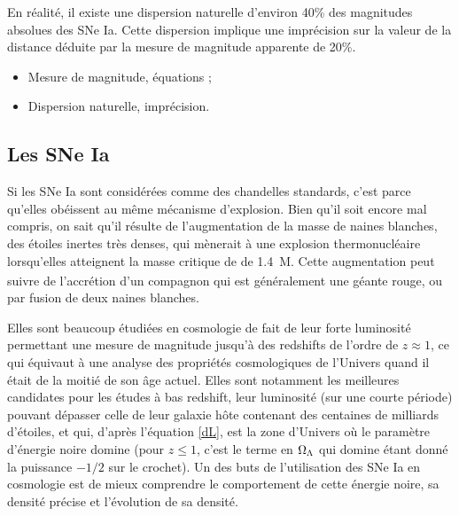 \documentclass[a4paper, 12pt, svgnames]{article}
\begin{document}
En réalité, il existe une dispersion naturelle d'environ 40\% des magnitudes
absolues des SNe Ia. Cette dispersion implique une imprécision sur la valeur de
la distance déduite par la mesure de magnitude apparente de 20\%.

%

\begin{itemize}
    \item Mesure de magnitude, équations ;
    \item Dispersion naturelle, imprécision.
\end{itemize}

\subsection{Les SNe Ia}\label{ssc:sneia}

Si les SNe Ia sont considérées comme des chandelles standards, c'est parce
qu'elles obéissent au même mécanisme d'explosion. Bien qu'il soit encore mal
compris, on sait qu'il résulte de l'augmentation de la masse de naines
blanches, des étoiles inertes très denses, qui mènerait à une explosion
thermonucléaire lorsqu'elles atteignent la masse critique de 
de \SI{1.4}{M_\odot}. Cette augmentation peut suivre de l'accrétion d'un
compagnon qui est généralement une géante rouge, ou par fusion de deux naines
blanches.

Elles sont beaucoup étudiées en cosmologie de fait de leur forte luminosité
permettant une mesure de magnitude jusqu'à des redshifts de l'ordre de $z
\approx 1$, ce qui équivaut à une analyse des propriétés cosmologiques de
l'Univers quand il était de la moitié de son âge actuel. Elles sont notamment
les meilleures candidates pour les études à bas redshift, leur luminosité (sur
une courte période) pouvant dépasser celle de leur galaxie hôte contenant des
centaines de milliards d'étoiles,  et qui, d'après l'équation \ref{dL}, est la
zone d'Univers où le paramètre d'énergie noire domine (pour $z \leq 1$, c'est le
terme en $\Omega_\Lambda$ qui domine étant donné la puissance $-1/2$ sur le crochet). Un
des buts de l'utilisation des SNe Ia en cosmologie est de mieux comprendre le
comportement de cette énergie noire, sa densité précise et l'évolution de sa
densité.
\end{document}
